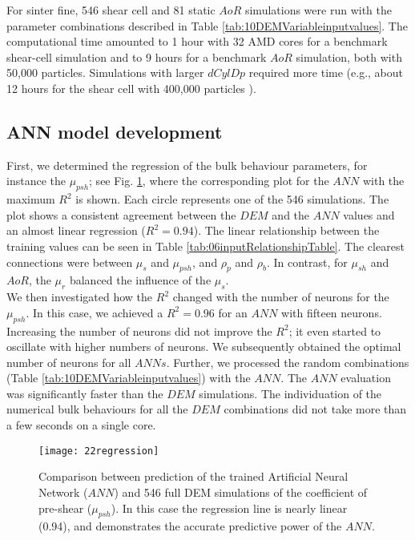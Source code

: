 \documentclass[review]{elsarticle}
\begin{document}
For sinter fine, 546 shear cell and 81 static $AoR$ simulations were run with
the parameter combinations described in Table
\ref{tab:10DEMVariableinputvalues}.
The computational time amounted to 1 hour with 32 AMD cores for a benchmark
shear-cell simulation and to 9 hours for a benchmark $AoR$ simulation, both with
50,000 particles.
Simulations with larger $dCylDp$ required more time (e.g., about 12 hours for
the shear cell with 400,000 particles ). \\


\subsection{ANN model development}
\label{subsec:annmodeldev}

First, we determined the regression of the bulk behaviour parameters, for
instance the $\mu_{psh}$; see Fig. \ref{fig:22regression}, where the
corresponding plot for the $ANN$ with the maximum $R^2$ is shown. Each circle represents one of the 546
simulations.
The plot shows a consistent agreement between the 
$DEM$ and the $ANN$ values and an almost linear regression ($R^2
= 0.94$).
The linear relationship between the
training values can be seen in Table \ref{tab:06inputRelationshipTable}.
The clearest connections were between $\mu_s$ and $\mu_{psh}$, and
$\rho_p$ and $\rho_b$.
In contrast, for $\mu_{sh}$ and $AoR$, the $\mu_r$ balanced the influence of the 
$\mu_s$. \\
We then investigated how the $R^2$ changed with the number of neurons
for the $\mu_{psh}$.
In this case, we achieved a $R^2 = 0.96$ for an $ANN$ with fifteen neurons. 
Increasing the number of neurons did not improve the $R^2$; it even started to
oscillate with higher numbers of neurons.
We subsequently obtained the optimal number of neurons for all $ANNs$.
Further, we processed the random combinations (Table
\ref{tab:10DEMVariableinputvalues}) with the $ANN$.
The $ANN$ evaluation was significantly faster than the $DEM$ simulations. The
individuation of the numerical bulk behaviours for all the $DEM$ combinations
did not take more than a few seconds on a single core.
\begin{figure}[!h] 
\centering 
\texttt{[image: 22regression]}
\caption[Comparison between prediction of the trained ANN and full DEM
simulation]{Comparison between prediction of the trained Artificial Neural
Network ($ANN$) and 546 full DEM simulations of the coefficient of pre-shear
($\mu_{psh}$). In this case the regression line is nearly linear (0.94), and
demonstrates the accurate predictive power of the $ANN$.}
\label{fig:22regression} 
\end{figure}
\end{document}

